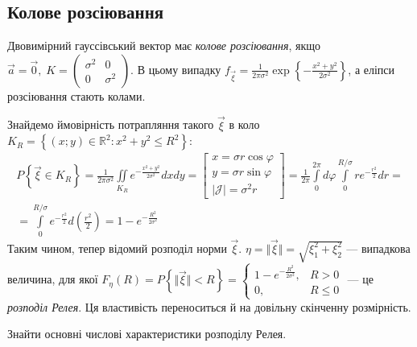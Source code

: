 \subsection{Колове розсіювання}
\begin{definition}
    Двовимірний гауссівський вектор має \emph{колове розсіювання}, якщо
    $\vec{a} = \vec{0}, \; K = \begin{pmatrix}
        \sigma^2 & 0 \\
        0 & \sigma^2
    \end{pmatrix}$. В цьому випадку $f_{\vec{\xi}} = \frac{1}{2\pi\sigma^2} \exp\left\{-\frac{x^2+y^2}{2\sigma^2}\right\}$, 
    а еліпси розсіювання стають колами.
\end{definition}
Знайдемо ймовірність потрапляння такого $\vec{\xi}$ в коло $K_R = \left\{(x; y) \in \mathbb{R}^2 : x^2 + y^2 \leq R^2\right\}$:
\begin{gather*}
    P\left\{\vec{\xi} \in K_R\right\} = \frac{1}{2\pi\sigma^2} \iint\limits_{K_R} e^{-\frac{x^2+y^2}{2\sigma^2}} dx dy = 
    \left[ \begin{gathered}
        x = \sigma r\cos\varphi \\
        y = \sigma r\sin\varphi \\
        |\mathcal{J}| = \sigma^2 r
    \end{gathered}\right] =
    \frac{1}{2\pi} \int\limits_0^{2\pi} d\varphi \int\limits_0^{R/\sigma} r e^{-\frac{r^2}{2}} dr = \\
    = \int\limits_0^{R/\sigma} e^{-\frac{r^2}{2}} d \left( \frac{r^2}{2}\right) = 
    1 - e^{-\frac{R^2}{2\sigma^2}}
\end{gather*}
Таким чином, тепер відомий розподіл норми $\vec{\xi}$. $\eta = \Vert \vec{\xi} \Vert = \sqrt{\xi_1^2 + \xi_2^2}$ --- випадкова величина,
для якої $F_{\eta}(R) = P\left\{\Vert \vec{\xi} \Vert < R\right\} = \begin{cases}
    1 - e^{-\frac{R^2}{2\sigma^2}}, & R > 0 \\
    0, & R \leq 0
\end{cases}$ --- це \emph{розподіл Релея}. Ця властивість переноситься й на довільну скінченну розмірність.

\begin{exercise}
    Знайти основні числові характеристики розподілу Релея.
\end{exercise}

